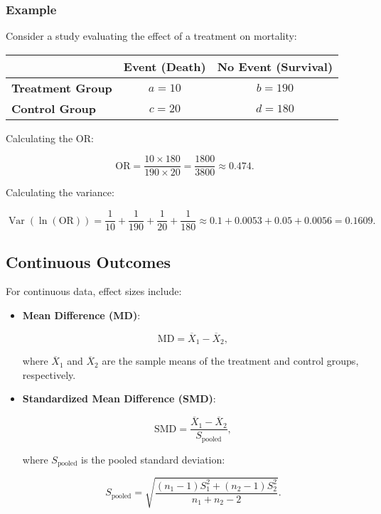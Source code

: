 \documentclass[12pt,a4paper]{report}
\newcommand{\Var}{\operatorname{Var}}
\begin{document}
\subsubsection{Example}
\label{subsubsec:binary_example}

Consider a study evaluating the effect of a treatment on mortality:

\begin{center}
\begin{tabular}{lcc}
\toprule
 & \textbf{Event (Death)} & \textbf{No Event (Survival)} \\
\midrule
\textbf{Treatment Group} & $a = 10$ & $b = 190$ \\
\textbf{Control Group} & $c = 20$ & $d = 180$ \\
\bottomrule
\end{tabular}
\end{center}

Calculating the OR:

\[
\text{OR} = \frac{10 \times 180}{190 \times 20} = \frac{1800}{3800} \approx 0.474.
\]

Calculating the variance:

\[
\Var\left( \ln(\text{OR}) \right) = \frac{1}{10} + \frac{1}{190} + \frac{1}{20} + \frac{1}{180} \approx 0.1 + 0.0053 + 0.05 + 0.0056 = 0.1609.
\]

\subsection{Continuous Outcomes}
\label{subsec:continuous_outcomes}

For continuous data, effect sizes include:

\begin{itemize}
    \item \textbf{Mean Difference (MD)}:

    \begin{equation}
    \label{eq:mean_difference}
    \text{MD} = \overline{X}_1 - \overline{X}_2,
    \end{equation}

    where $\overline{X}_1$ and $\overline{X}_2$ are the sample means of the treatment and control groups, respectively.

    \item \textbf{Standardized Mean Difference (SMD)}:

    \begin{equation}
    \label{eq:smd}
    \text{SMD} = \frac{\overline{X}_1 - \overline{X}_2}{S_{\text{pooled}}},
    \end{equation}

    where $S_{\text{pooled}}$ is the pooled standard deviation:

    \begin{equation}
    \label{eq:s_pooled}
    S_{\text{pooled}} = \sqrt{\frac{(n_1 - 1) S_1^2 + (n_2 - 1) S_2^2}{n_1 + n_2 - 2}}.
    \end{equation}
\end{itemize}
\end{document}
